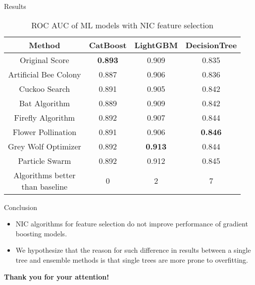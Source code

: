 \documentclass[aspectratio=169,xcolor=dvipsnames]{beamer}
\begin{document}
\begin{frame}{Results}
	\begin{table}
		\centering
		\caption{ROC AUC of ML models with NIC feature selection}
		\label{tab:results}
		\begin{tabular}{c c c c}
			\hline
			Method                & CatBoost       & LightGBM       & DecisionTree   \\
			\hline
			Original Score        & \textbf{0.893} & 0.909          & 0.835          \\
			Artificial Bee Colony & 0.887          & 0.906          & 0.836          \\
			Cuckoo Search         & 0.891          & 0.905          & 0.842          \\
			Bat Algorithm         & 0.889          & 0.909          & 0.842          \\
			Firefly Algorithm     & 0.892          & 0.907          & 0.844          \\
			Flower Pollination    & 0.891          & 0.906          & \textbf{0.846} \\
			Grey Wolf Optimizer   & 0.892          & \textbf{0.913} & 0.844          \\
			Particle Swarm        & 0.892          & 0.912          & 0.845          \\
			\hline
			\makecell{Algorithms better                                               \\
			than baseline}        & 0              & 2              & 7              \\
			\hline
		\end{tabular}
	\end{table}
\end{frame}

\begin{frame}{Conclusion}
	\begin{itemize}
		\item NIC algorithms for feature selection do not improve
		      performance of gradient boosting models.
		\item We hypothesize that the reason for such difference
		      in results between a single tree and ensemble methods is that
		      single trees are more prone to overfitting.
	\end{itemize}
\end{frame}

\begin{frame}
	\Huge{\centerline{\textbf{Thank you for your attention!}}}
\end{frame}

\end{document}

